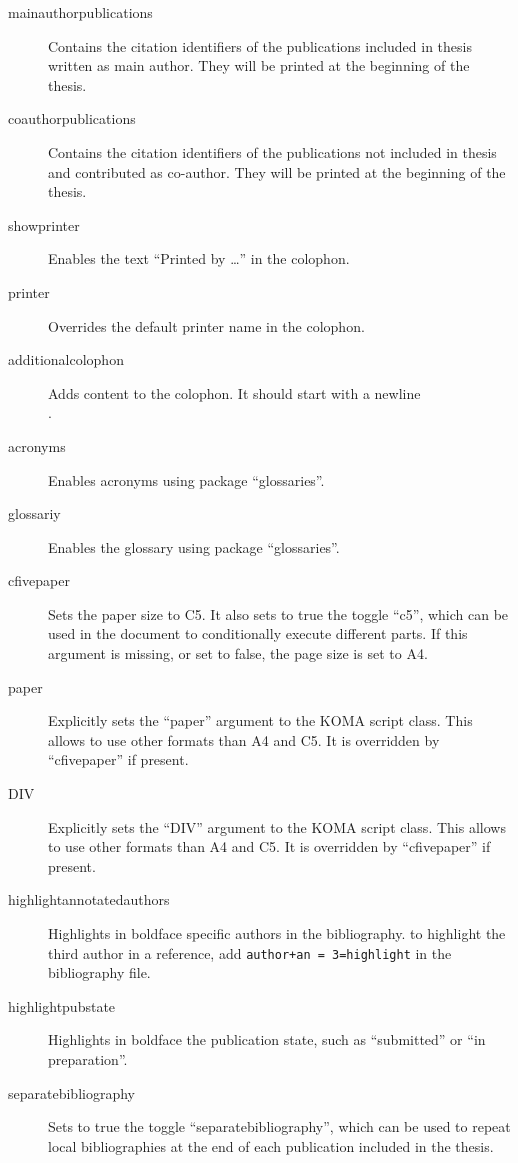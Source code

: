 \begin{description}
    \item[mainauthorpublications] Contains the citation identifiers of the publications included in thesis written as main author.
        They will be printed at the beginning of the thesis.
    \item[coauthorpublications] Contains the citation identifiers of the publications not included in thesis and contributed as co-author.
        They will be printed at the beginning of the thesis.
    \item[showprinter] Enables the text \enquote{Printed by \ldots} in  the colophon.
    \item[printer] Overrides the default printer name in the colophon.
    \item[additionalcolophon] Adds content to the colophon.
        It should start with a newline \texttt{\\}.
    \item[acronyms] Enables acronyms using package \enquote{glossaries}.
    \item[glossariy] Enables the glossary using package \enquote{glossaries}.
    \item[cfivepaper] Sets the paper size to C5.
        It also sets to true the toggle \enquote{c5}, which can be used in the document to conditionally execute different parts.
        If this argument is missing, or set to false, the page size is set to A4.
    \item[paper] Explicitly sets the \enquote{paper} argument to the KOMA script class.
        This allows to use other formats than A4 and C5.
        It is overridden by \enquote{cfivepaper} if present.
    \item[DIV] Explicitly sets the \enquote{DIV} argument to the KOMA script class.
        This allows to use other formats than A4 and C5.
        It is overridden by \enquote{cfivepaper} if present.
    \item[highlightannotatedauthors] Highlights in boldface specific authors in the bibliography.
        \Eg to highlight the third author in a reference, add \texttt{author+an = {3=highlight}} in the bibliography file.
    \item[highlightpubstate] Highlights in boldface the publication state, such as \enquote{submitted} or \enquote{in preparation}.
    \item[separatebibliography] Sets to true the toggle \enquote{separatebibliography}, which can be used to repeat local bibliographies at the end of each publication included in the thesis.

\end{description}
